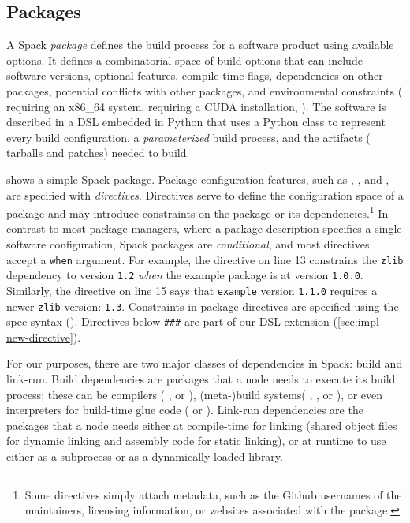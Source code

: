 \subsection{Packages}
\label{sec:spack-packages}
A Spack \textit{package} defines the build process for a software
product using available options. It defines a combinatorial space of build
options that can include software versions, optional features,
compile-time flags, dependencies on other packages, potential conflicts with
other packages, and environmental constraints (\eg{} requiring an x86\_64
system, requiring a CUDA installation, \etc{}).
The software is described in a DSL embedded in Python that uses a Python
class to represent every build configuration, a \textit{parameterized} build
process, and the artifacts (\eg{} tarballs and patches) needed to build.
%

%
 shows a simple Spack package. Package
configuration features, such as , ,
and , are specified with \textit{directives}. Directives
serve to define the configuration space of a package and may introduce
constraints on the package or its dependencies.\footnote{Some directives
  simply attach metadata, such as the Github usernames of the maintainers,
  licensing information, or websites associated with the package.}
In contrast to most package managers, where a package description specifies
a single software configuration, Spack packages are {\it conditional}, and most
directives accept a {\tt when} argument. For example, the 
directive on line 13 constrains the {\tt zlib} dependency to version {\tt 1.2}
{\it when} the example package is at version {\tt 1.0.0}. Similarly, the
directive on line 15 says that
{\tt example} version {\tt 1.1.0} requires a newer {\tt zlib} version: {\tt 1.3}.
Constraints in package directives are specified using the spec syntax
(). Directives below \texttt{\#\#\#}
are part of our DSL extension (\cref{sec:impl-new-directive}).

For our purposes, there are two major classes of dependencies in Spack: build
and link-run. Build dependencies are packages that a node needs to
execute its build process; these can be compilers (\eg{} , or
), (meta-)build systems(\eg{} ,
, or ), or even interpreters for build-time glue
code (\eg{}  or ). Link-run dependencies are the
packages that a node needs either at compile-time for linking (\ie shared
object files for dynamic linking and assembly code for static linking), or at
runtime to use either as a subprocess or as a dynamically loaded library.
%

